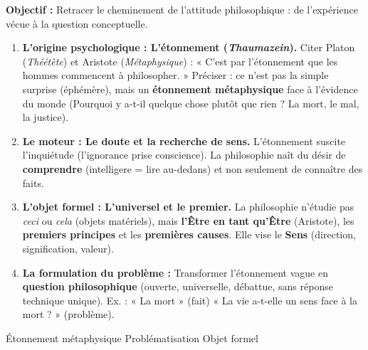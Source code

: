 \documentclass[11pt]{article}
\newcommand{\cle}[1]{{\popxbold\color{popdark}#1}}
\begin{document}
\begin{methode}
\textbf{Objectif :} Retracer le cheminement de l'attitude philosophique : de l'expérience vécue à la question conceptuelle.
\begin{enumerate}
    \item \textbf{L'origine psychologique : L'étonnement (\emph{Thaumazein}).} Citer Platon (\emph{Théétète}) et Aristote (\emph{Métaphysique}) : « C'est par l'étonnement que les hommes commencent à philosopher. » Préciser : ce n'est pas la simple surprise (éphémère), mais un \textbf{étonnement métaphysique} face à l'évidence du monde (Pourquoi y a-t-il quelque chose plutôt que rien ? La mort, le mal, la justice).
    \item \textbf{Le moteur : Le doute et la recherche de sens.} L'étonnement suscite l'inquiétude (l'ignorance prise conscience). La philosophie naît du désir de \textbf{comprendre} (intelligere = lire au-dedans) et non seulement de connaître des faits.
    \item \textbf{L'objet formel : L'universel et le premier.} La philosophie n'étudie pas \emph{ceci} ou \emph{cela} (objets matériels), mais \textbf{l'Être en tant qu'Être} (Aristote), les \textbf{premiers principes} et les \textbf{premières causes}. Elle vise le \textbf{Sens} (direction, signification, valeur).
    \item \textbf{La formulation du problème :} Transformer l'étonnement vague en \textbf{question philosophique} (ouverte, universelle, débattue, sans réponse technique unique). Ex. : « La mort » (fait) \textrightarrow{} « La vie a-t-elle un sens face à la mort ? » (problème).
\end{enumerate}
\cle{Étonnement métaphysique} \cle{Problématisation} \cle{Objet formel}
\end{methode}
\end{document}
